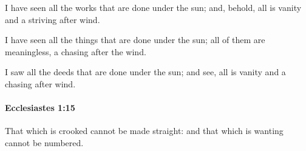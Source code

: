 			\begin{versebox}
					\item[BHS] 
					\item[LXX] 
					\item[ASV] I have seen all the works that are done under the sun; and, behold, all is vanity and a striving after wind.
					\item[NIV] I have seen all the things that are done under the sun; all of them are meaningless, a chasing after the wind.
					\item[NRSV] I saw all the deeds that are done under the sun; and see, all is vanity and a chasing after wind.
			\end{versebox}

		\paragraph{Ecclesiastes 1:15} %
			\label{ECCLESIASTES-1-15}

			That which is crooked cannot be made straight: and that which is wanting cannot be numbered.

